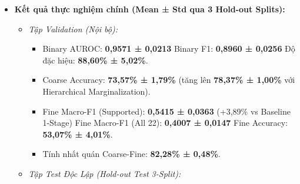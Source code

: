 \documentclass[
  10pt,
  a4paper,
  twocolumn]{article}
\providecommand{\tightlist}{%
  \setlength{\itemsep}{0pt}\setlength{\parskip}{0pt}}
\begin{document}
\begin{itemize}
\begin{itemize}
    \begin{enumerate}
    \def\labelenumi{\arabic{enumi}.}
    \tightlist
    \item
      \emph{Phase 1 (Representation Learning):} Mở 100\% Backbone
      Swin-Tiny + 3 Heads; tối ưu hàm mất mát kết hợp BCE + CE +
      Supervised Contrastive (\(L_{\text{supcon}}\)) + \textbf{Lịch
      trình Curriculum Hierarchy Warmup}
      (\(w_{\text{hrc}}(t) = 0{,}25 \cdot \min(1{,}0, t/12)\)) giúp mạng
      tự do học biểu diễn phong phú trước khi siết chặt cấu trúc phả hệ.
    \item
      \emph{Phase 2 (Coarse Alignment):} Đóng băng Backbone + Binary \&
      Fine Heads; chỉ nắn \texttt{coarse\_head} với
      \textbf{Patient-Prior Smoothed Balanced Softmax (PP-SBS)} với cơ
      chế cô lập tham số (\emph{parameter isolation}).
    \item
      \emph{Phase 3 (Fine Alignment):} Đóng băng Backbone + Binary \&
      Coarse Heads; chỉ nắn \texttt{fine\_head} với PP-SBS theo prior
      căn bậc hai số bệnh nhân
      \(\pi_j = (\text{patients}_j + \epsilon)^{0{,}5}\).
    \end{enumerate}
  \item
    \textbf{Hierarchical Marginalization \& Multi-Head Blending
    Inference:} Cộng dồn xác suất từ 22 phân lớp chẩn đoán chi tiết về 5
    nhóm cha Coarse (\(P_{\text{from\_fine}}\)) kết hợp Ensemble
    (\(\lambda=0{,}25\)), tăng cường độ chính xác nhóm cha.
  \end{itemize}
\item
  \textbf{Kết quả thực nghiệm chính (Mean ± Std qua 3 Hold-out Splits):}

  \begin{itemize}
  \tightlist
  \item
    \emph{Tập Validation (Nội bộ):}

    \begin{itemize}
    \tightlist
    \item
      Binary AUROC: \textbf{0,9571 ± 0,0213} \textbar{} Binary F1:
      \textbf{0,8960 ± 0,0256} \textbar{} Độ đặc hiệu: \textbf{88,60\% ±
      5,02\%}.
    \item
      Coarse Accuracy: \textbf{73,57\% ± 1,79\%} (tăng lên
      \textbf{78,37\% ± 1,00\%} với Hierarchical Marginalization).
    \item
      Fine Macro-F1 (Supported): \textbf{0,5415 ± 0,0363} (+3,89\% vs
      Baseline 1-Stage) \textbar{} Fine Macro-F1 (All 22):
      \textbf{0,4007 ± 0,0147} \textbar{} Fine Accuracy: \textbf{53,07\%
      ± 4,01\%}.
    \item
      Tính nhất quán Coarse-Fine: \textbf{82,28\% ± 0,48\%}.
    \end{itemize}
  \item
    \emph{Tập Test Độc Lập (Hold-out Test 3-Split):}


\end{itemize}
\end{itemize}
\end{document}

